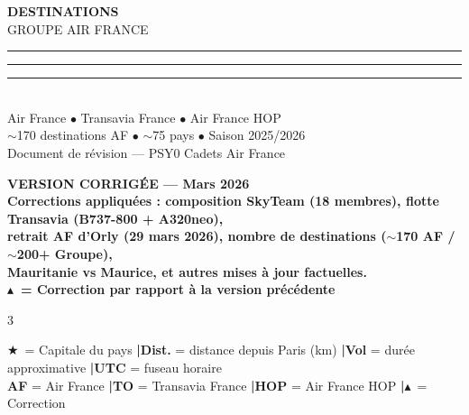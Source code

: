\documentclass[9pt,a4paper,landscape]{article}
\newcommand{\sectionbanner}[2]{%
\noindent\colorbox{#1}{\parbox{\dimexpr\textwidth-2\fboxsep}{%
\vspace{3pt}\hspace{6pt}{\Large\bfseries\color{white}#2}\vspace{3pt}}}%
\vspace{4pt}%
}
\newcommand{\CAP}{\textcolor{capgold}{$\bigstar$}}
\newcommand{\CORR}{\textcolor{afred}{$\blacktriangle$}}
\begin{document}
\thispagestyle{empty}
\begin{center}
\vspace*{3cm}
{\fontsize{36}{42}\selectfont\bfseries\color{afblue} DESTINATIONS}\\[0.4cm]
{\fontsize{20}{26}\selectfont\color{afblue} GROUPE AIR FRANCE}\\[0.6cm]
\textcolor{afblue}{\rule{4cm}{3pt}}\textcolor{white!50!black}{\rule{4cm}{3pt}}\textcolor{afred}{\rule{4cm}{3pt}}\\[0.6cm]
{\Large Air France $\bullet$ Transavia France $\bullet$ Air France HOP}\\[0.3cm]
{\large $\sim$170 destinations AF $\bullet$ $\sim$75 pays $\bullet$ Saison 2025/2026}\\[0.5cm]
{\normalsize Document de révision --- PSY0 Cadets Air France}\\[1.5cm]
\begin{tcolorbox}[colback=afred!10,colframe=afred,boxrule=1.5pt,arc=4pt,width=0.7\textwidth]
\centering\small\bfseries
VERSION CORRIGÉE --- Mars 2026\\[4pt]
\normalfont\small
Corrections appliquées : composition SkyTeam (18 membres), flotte Transavia (B737-800 + A320neo),\\
retrait AF d'Orly (29 mars 2026), nombre de destinations ($\sim$170 AF / $\sim$200+ Groupe),\\
Mauritanie vs Maurice, et autres mises à jour factuelles.\\[4pt]
\CORR\ = Correction par rapport à la version précédente
\end{tcolorbox}
\end{center}
\clearpage
\restoregeometry

\thispagestyle{fancy}
\sectionbanner{afblue}{TABLE DES MATIÈRES}
\vspace{0.2cm}
\begin{multicols}{3}
\small
\tableofcontents
\end{multicols}

\vspace{0.4cm}
\begin{tcolorbox}[colback=aflight,colframe=afblue,boxrule=1.5pt,arc=4pt]
\centering\small
\CAP\ = Capitale du pays \quad\textbf{|}\quad \textbf{Dist.} = distance depuis Paris (km) \quad\textbf{|}\quad \textbf{Vol} = durée approximative \quad\textbf{|}\quad \textbf{UTC} = fuseau horaire\\[2pt]
\textbf{AF} = Air France \quad\textbf{|}\quad \textbf{TO} = Transavia France \quad\textbf{|}\quad \textbf{HOP} = Air France HOP \quad\textbf{|}\quad \CORR\ = Correction
\end{tcolorbox}
\vspace{-0.2cm}
\end{document}
